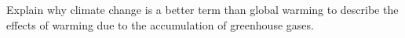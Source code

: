 \showpoints

\question[5]
Explain why climate change is a better term than global warming to describe the effects of warming due to the accumulation of greenhouse gases.

